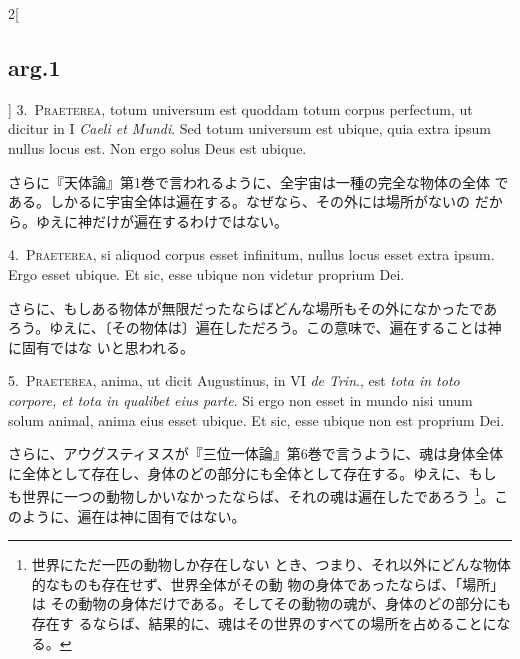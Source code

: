 \documentclass[paper=a4paper,fontsize=10pt,jafontsize=9pt,titlepage]{jlreq}
\begin{document}
\begin{paracol}{2}[\subsection{arg.1}]
3.~{\scshape Praeterea}, totum universum est quoddam totum corpus
 perfectum, ut dicitur in I {\itshape Caeli et Mundi}. Sed totum
 universum est ubique, quia extra ipsum nullus locus est. Non ergo solus
 Deus est ubique.

\switchcolumn

さらに『天体論』第1巻で言われるように、全宇宙は一種の完全な物体の全体
 である。しかるに宇宙全体は遍在する。なぜなら、その外には場所がないの
 だから。ゆえに神だけが遍在するわけではない。


4.~{\scshape Praeterea}, si aliquod corpus esset infinitum, nullus locus esset
 extra ipsum. Ergo esset ubique. Et sic, esse ubique non videtur
 proprium Dei.

\switchcolumn

さらに、もしある物体が無限だったならばどんな場所もその外になかったであ
 ろう。ゆえに、〔その物体は〕遍在しただろう。この意味で、遍在することは神に固有ではな
 いと思われる。


5.~{\scshape Praeterea}, anima, ut dicit Augustinus, in VI {\itshape de
 Trin}., est {\itshape tota in toto corpore, et tota in qualibet eius
 parte}. Si ergo non esset in mundo nisi unum solum animal, anima eius
 esset ubique. Et sic, esse ubique non est proprium Dei.

\switchcolumn

さらに、アウグスティヌスが『三位一体論』第6巻で言うように、魂は身体全体
 に全体として存在し、身体のどの部分にも全体として存在する。ゆえに、もし
 も世界に一つの動物しかいなかったならば、それの魂は遍在したであろう
 \footnote{世界にただ一匹の動物しか存在しない
 とき、つまり、それ以外にどんな物体的なものも存在せず、世界全体がその動
 物の身体であったならば、「場所」は
 その動物の身体だけである。そしてその動物の魂が、身体のどの部分にも存在す
 るならば、結果的に、魂はその世界のすべての場所を占めることになる。}。こ
 のように、遍在は神に固有ではない。



\end{paracol}
\end{document}
